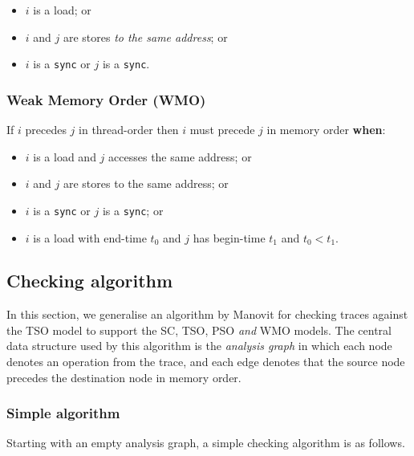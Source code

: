 \documentclass[11pt]{article}
\begin{document}
\begin{itemize}
\item $i$ is a load; or
\item $i$ and $j$ are stores \emph{to the same address}; or
\item $i$ is a \verb!sync! or $j$ is a \verb!sync!.
\end{itemize}

\subsubsection*{Weak Memory Order (WMO)}

If $i$ precedes $j$ in thread-order then $i$ must precede
$j$ in memory order \textbf{when}:

\begin{itemize}

\item $i$ is a load and $j$ accesses the same address; or

\item $i$ and $j$ are stores to the same address; or

\item $i$ is a \verb!sync! or $j$ is a \verb!sync!; or

\item $i$ is a load with end-time $t_0$ and $j$ has begin-time
$t_1$ and $t_0 < t_1$.

\end{itemize}

\subsection{Checking algorithm}

In this section, we generalise an algorithm by Manovit \cite{Manovit}
for checking traces against the TSO model to support the SC, TSO, PSO
\emph{and} WMO models.  The central data structure used by this
algorithm is the \emph{analysis graph} in which each node denotes an
operation from the trace, and each edge denotes that the source node
precedes the destination node in memory order.


\subsubsection*{Simple algorithm}

Starting with an empty analysis graph, a simple checking algorithm is
as follows.
\end{document}
